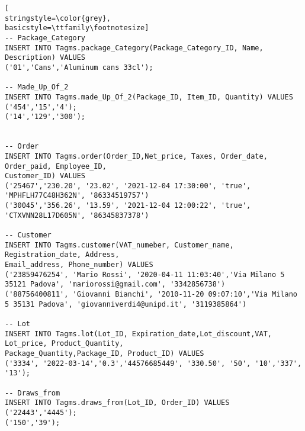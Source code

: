 \begin{lstlisting}[
stringstyle=\color{grey},
basicstyle=\ttfamily\footnotesize]
-- Package_Category
INSERT INTO Tagms.package_Category(Package_Category_ID, Name, Description) VALUES 
('01','Cans','Aluminum cans 33cl');

-- Made_Up_Of_2
INSERT INTO Tagms.made_Up_Of_2(Package_ID, Item_ID, Quantity) VALUES
('454','15','4');
('14','129','300');


-- Order
INSERT INTO Tagms.order(Order_ID,Net_price, Taxes, Order_date, Order_paid, Employee_ID, 
Customer_ID) VALUES 
('25467','230.20', '23.02', '2021-12-04 17:30:00', 'true', 'MPHFLH77C48H362N', '86334519757')
('30045','356.26', '13.59', '2021-12-04 12:00:22', 'true', 'CTXVNN28L17D605N', '86345837378')

-- Customer
INSERT INTO Tagms.customer(VAT_numeber, Customer_name, Registration_date, Address, 
Email_address, Phone_number) VALUES
('23859476254', 'Mario Rossi', '2020-04-11 11:03:40','Via Milano 5 35121 Padova', 'mariorossi@gmail.com', '3342856738')
('88756400811', 'Giovanni Bianchi', '2010-11-20 09:07:10','Via Milano 5 35131 Padova', 'giovanniverdi4@unipd.it', '3119385864')

-- Lot
INSERT INTO Tagms.lot(Lot_ID, Expiration_date,Lot_discount,VAT, Lot_price, Product_Quantity, 
Package_Quantity,Package_ID, Product_ID) VALUES 
('3334', '2022-03-14','0.3','44576685449', '330.50', '50', '10','337', '13');

-- Draws_from
INSERT INTO Tagms.draws_from(Lot_ID, Order_ID) VALUES 
('22443','4445');
('150','39');

\end{lstlisting}